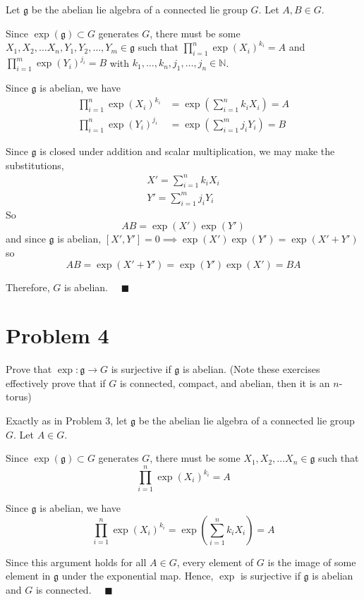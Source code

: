\documentclass[12pt]{article}
\newcommand{\N}{\mathbb{N}}
\newcommand{\qed}{\quad \blacksquare}
\newcommand{\g}{\mathfrak{g}}
\begin{document}
    \color{blue} 
        Let $\g$ be the abelian lie algebra of a connected lie group $G$. Let $A, B \in G$. 

        Since $\exp(\g) \subset G$ generates $G$, there must be some $X_1, X_2, \dots X_n, Y_1, Y_2, \dots, Y_m \in \g$ such that $\prod_{i=1}^n \exp(X_i)^{k_i} = A$ and $\prod_{i=1}^m \exp(Y_i)^{j_i} = B$ with $k_1, \dots, k_n, j_1, \dots, j_n \in \N$. 

        Since $\g$ is abelian, we have 
        \begin{align*}
            \prod_{i=1}^n \exp(X_i)^{k_i} &= \exp\left(\sum_{i=1}^n k_iX_i\right) = A\\ 
            \prod_{i=1}^n \exp(Y_i)^{j_i} &= \exp\left(\sum_{i=1}^m j_iY_i\right) = B
        \end{align*} 
        
        Since $\g$ is closed under addition and scalar multiplication, we may make the substitutions, 
        \begin{align*}
            X' = \sum_{i=1}^n k_iX_i\\ 
            Y' = \sum_{i=1}^m j_iY_i
        \end{align*}
        So 
        \[AB = \exp(X')\exp(Y')\] 
        and since $\g$ is abelian, $[X', Y'] = 0 \implies \exp(X')\exp(Y') = \exp(X' + Y')$ so 
        \[AB = \exp(X' + Y') = \exp(Y')\exp(X') = BA\]

        Therefore, $G$ is abelian. $\qed$
    \color{black}

\pagebreak


\section*{Problem 4}
Prove that $\exp: \mathfrak{g} \longrightarrow G$ is surjective if $\g$ is abelian.  (Note these exercises effectively prove that if $G$ is connected, compact, and abelian, then it is an $n$-torus)

    \color{blue}
        Exactly as in Problem 3, let $\g$ be the abelian lie algebra of a connected lie group $G$. Let $A \in G$. 

        Since $\exp(\g) \subset G$ generates $G$, there must be some $X_1, X_2, \dots X_n \in \g$ such that 
        \[\prod_{i=1}^n \exp(X_i)^{k_i} = A\]

        Since $\g$ is abelian, we have 
        \[\prod_{i=1}^n \exp(X_i)^{k_i} = \exp\left(\sum_{i=1}^n k_i X_i\right) = A\]
        
        Since this argument holds for all $A \in G$, every element of $G$ is the image of some element in $\g$ under the exponential map. Hence, $\exp$ is surjective if $\g$ is abelian and $G$ is connected. $\qed$
        
\end{document}

